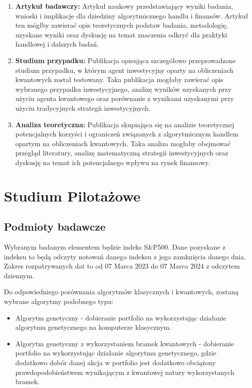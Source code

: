 \documentclass[polish,envcountsect,10pt]{article}
\begin{document}
\begin{enumerate}
    \item \textbf{Artykuł badawczy:} Artykuł naukowy przedstawiający wyniki badania, wnioski i implikacje dla dziedziny algorytmicznego handlu i finansów. Artykuł ten mógłby zawierać opis teoretycznych podstaw badania, metodologię, uzyskane wyniki oraz dyskusję na temat znaczenia odkryć dla praktyki handlowej i dalszych badań.
    
    \item \textbf{Studium przypadku:} Publikacja opisująca szczegółowo przeprowadzone studium przypadku, w którym agent inwestycyjny oparty na obliczeniach kwantowych został testowany. Taka publikacja mogłaby zawierać opis wybranego przypadku inwestycyjnego, analizę wyników uzyskanych przy użyciu agenta kwantowego oraz porównanie z wynikami uzyskanymi przy użyciu tradycyjnych strategii inwestycyjnych.
    
    \item \textbf{Analiza teoretyczna:} Publikacja skupiająca się na analizie teoretycznej potencjalnych korzyści i ograniczeń związanych z algorytmicznym handlem opartym na obliczeniach kwantowych. Taka analiza mogłaby obejmować przegląd literatury, analizę matematyczną strategii inwestycyjnych oraz dyskusję na temat ich potencjalnego wpływu na rynek finansowy.
    
\end{enumerate}
\section{Studium Pilotażowe}

\subsection{Podmioty badawcze}

Wybranym badanym elementem będzie indeks S\&P500. Dane pozyskane z indeksu to będą odczyty notowań danego indeksu z jego zamknięcia danego dnia. Zakres rozpatrywanych dat to od 07 Marca 2023 do 07 Marca 2024 z odczytem dziennym. 

Do odpowiedniego porównania algorytmów klasycznych i kwantowych, zostaną wybrane algorytmy podobnego typu:
\begin{itemize}
    \item Algorytm genetyczny - dobieranie portfolio na wykorzystując działanie algorytmu genetycznego na komputerze klasycznym.
    \item Algorytm genetyczny z wykorzystaniem bramek kwantowych - dobieranie portfolio na wykorzystując działanie algorytmu genetycznego, gdzie dodatkowo dobór danej akcja w portfolio jest dodatkowo obciążony prawdopodobieństwem wynikającym z kwantowej natury wykorzystanych bramek.
\end{itemize}
\end{document}
